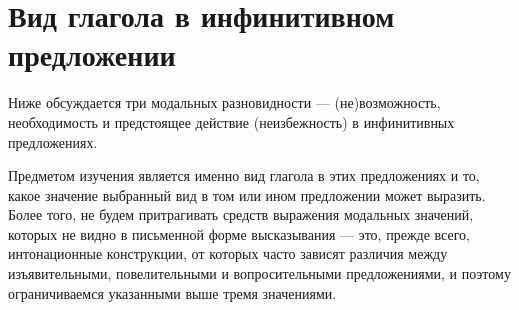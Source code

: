 \section{Вид глагола в инфинитивном предложении}

Ниже обсуждается три модальных разновидности --- (не)возможность, необходимость и предстоящее действие (неизбежность) в инфинитивных предложениях. 
%

Предметом изучения является именно вид глагола в этих предложениях и то, какое значение выбранный вид в том или ином предложении может выразить. Более того, не будем притрагивать средств выражения модальных значений, которых не видно в письменной форме высказывания --- это, прежде всего, интонационные конструкции, от которых часто зависят различия между изъявительными, повелительными и вопросительными предложениями, и поэтому ограничиваемся указанными выше тремя значениями. 






